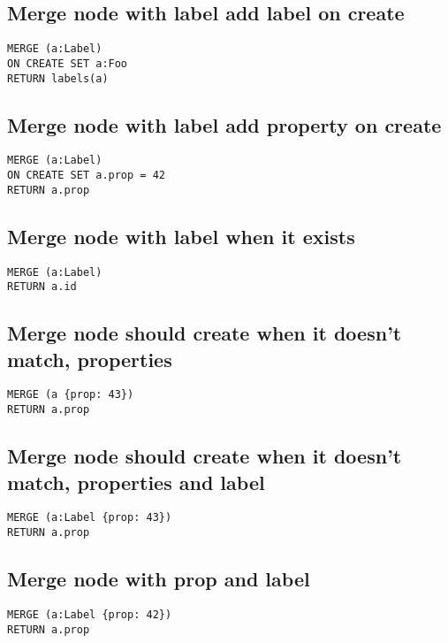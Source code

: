 \subsection{Merge node with label add label on create}

\begin{lstlisting}
MERGE (a:Label)
ON CREATE SET a:Foo
RETURN labels(a)
\end{lstlisting}

\subsection{Merge node with label add property on create}

\begin{lstlisting}
MERGE (a:Label)
ON CREATE SET a.prop = 42
RETURN a.prop
\end{lstlisting}

\subsection{Merge node with label when it exists}

\begin{lstlisting}
MERGE (a:Label)
RETURN a.id
\end{lstlisting}

\subsection{Merge node should create when it doesn't match, properties}

\begin{lstlisting}
MERGE (a {prop: 43})
RETURN a.prop
\end{lstlisting}

\subsection{Merge node should create when it doesn't match, properties and label}

\begin{lstlisting}
MERGE (a:Label {prop: 43})
RETURN a.prop
\end{lstlisting}

\subsection{Merge node with prop and label}

\begin{lstlisting}
MERGE (a:Label {prop: 42})
RETURN a.prop
\end{lstlisting}

